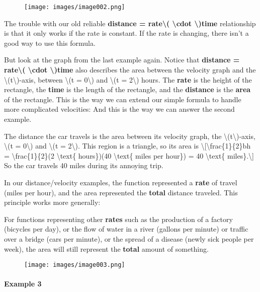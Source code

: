 \begin{figure}
\centering
\texttt{[image: images/image002.png]}
\caption{}
\end{figure}

The trouble with our old reliable \textbf{distance =
rate\textbackslash{}( \textbackslash{}cdot \textbackslash{})time}
relationship is that it only works if the rate is constant. If the rate
is changing, there isn't a good way to use this formula.

But look at the graph from the last example again. Notice that
\textbf{distance = rate\textbackslash{}( \textbackslash{}cdot
\textbackslash{})time} also describes the area between the velocity
graph and the \textbackslash{}(t\textbackslash{})-axis, between
\textbackslash{}(t = 0\textbackslash{}) and \textbackslash{}(t =
2\textbackslash{}) hours. The \textbf{rate} is the height of the
rectangle, the \textbf{time} is the length of the rectangle, and the
\textbf{distance} is the \textbf{area} of the rectangle. This is the way
we can extend our simple formula to handle more complicated velocities:
And this is the way we can answer the second example.

The distance the car travels is the area between its velocity graph, the
\textbackslash{}(t\textbackslash{})-axis, \textbackslash{}(t =
0\textbackslash{}) and \textbackslash{}(t = 2\textbackslash{}). This
region is a triangle, so its area is
\textbackslash{}{[}\textbackslash{}frac\{1\}\{2\}bh =
\textbackslash{}frac\{1\}\{2\}(2 \textbackslash{}text\{ hours\})(40
\textbackslash{}text\{ miles per hour\}) = 40 \textbackslash{}text\{
miles\}.\textbackslash{}{]} So the car travels 40 miles during its
annoying trip.

In our distance/velocity examples, the function represented a
\textbf{rate} of travel (miles per hour), and the area represented the
\textbf{total} distance traveled. This principle works more generally:

For functions representing other \textbf{rates} such as the production
of a factory (bicycles per day), or the flow of water in a river
(gallons per minute) or traffic over a bridge (cars per minute), or the
spread of a disease (newly sick people per week), the area will still
represent the \textbf{total} amount of something.

\begin{figure}
\centering
\texttt{[image: images/image003.png]}
\caption{}
\end{figure}

\hypertarget{example-3}{%
\paragraph{Example 3}\label{example-3}}

